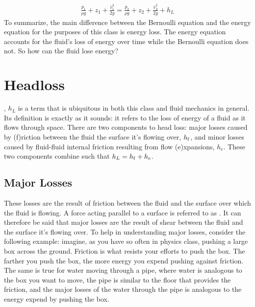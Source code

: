\documentclass[letterpaper,10pt,english]{sphinxmanual}
\begin{document}
\begin{equation}\label{equation:Review/Review_Fluid_Mechanics:energy_equation}
\begin{split}  \frac{p_{1}}{\rho g} + z_{1} + \frac{\bar v_{1}^2}{2g} = \frac{p_{2}}{\rho g} + z_{2} + \frac{\bar v_{2}^2}{2g} + h_L\end{split}
\end{equation}
 To summarize, the main difference between the Bernoulli equation and the energy equation for the purposes of this class is energy loss. The energy equation accounts for the fluid’s loss of energy over time while the Bernoulli equation does not. So how can the fluid lose energy?


\section{Headloss}
\label{\detokenize{Review/Review_Fluid_Mechanics:headloss}}\label{\detokenize{Review/Review_Fluid_Mechanics:heading-head-loss}}
, \(h_L\) is a term that is ubiquitous in both this class and fluid mechanics in general. Its definition is exactly as it sounds: it refers to the loss of energy of a fluid as it flows through space. There are two components to head loss: major losses caused by (f)riction between the fluid the surface it’s flowing over, \(h_{\rm{f}}\), and minor losses caused by fluid-fluid internal friction resulting from flow (e)xpansions, \(h_e\). These two components combine such that \(h_L = h_{\rm{f}} + h_e\).


\subsection{Major Losses}
\label{\detokenize{Review/Review_Fluid_Mechanics:major-losses}}\label{\detokenize{Review/Review_Fluid_Mechanics:heading-major-losses}}
These losses are the result of friction between the fluid and the surface over which the fluid is flowing. A force acting parallel to a surface is referred to as . It can therefore be said that major losses are the result of shear between the fluid and the surface it’s flowing over. To help in understanding major losses, consider the following example: imagine, as you have so often in physics class, pushing a large box across the ground. Friction is what resists your efforts to push the box. The farther you push the box, the more energy you expend pushing against friction. The same is true for water moving through a pipe, where water is analogous to the box you want to move, the pipe is similar to the floor that provides the friction, and the major losses of the water through the pipe is analogous to the energy  expend by pushing the box.
\end{document}
